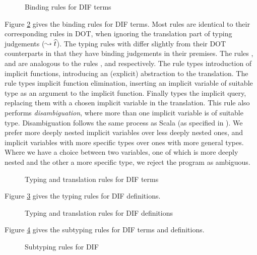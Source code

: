 \begin{figure}[h]
    
    \caption{Binding rules for DIF terms}
    \label{figure_binding_rules}
\end{figure}

Figure \ref{figure_typing_rules_terms} gives the binding rules for DIF terms.
Most rules are identical to their corresponding rules in DOT, when ignoring the
translation part of typing judgements ($\leadsto \widehat{t}$). The typing rules
with differ slightly from their DOT counterparts in that they have binding
judgements in their premises. The rules ,  and
 are analogous to the rules ,  and
 respectively. The rule  types introduction of
implicit functions, introducing an (explicit) abstraction to the translation.
The rule  types implicit function elimination, inserting an
implicit variable of suitable type as an argument to the implicit function.
Finally  types the implicit query, replacing them with a chosen
implicit variable in the translation. This rule also performs
\emph{disambiguation}, where more than one implicit variable is of suitable
type. Disambiguation follows the same process as Scala (as specified in
\cite{OBLB18}). We prefer more deeply nested implicit variables over less deeply
nested ones, and implicit variables with more specific types over ones with more
general types. Where we have a choice between two variables, one of which is
more deeply nested and the other a more specific type, we reject the program as
ambiguous.

\begin{figure}[h]
    
    \caption{Typing and translation rules for DIF terms}
    \label{figure_typing_rules_terms}
\end{figure}

Figure \ref{figure_typing_rules_definitions} gives the typing rules for DIF
definitions.

\begin{figure}[h]
    
    \caption{Typing and translation rules for DIF definitions}
    \label{figure_typing_rules_definitions}
\end{figure}

Figure \ref{figure_subtyping_rules} gives the subtyping rules for DIF terms and
definitions.

\begin{figure}[h]
    
    \caption{Subtyping rules for DIF}
    \label{figure_subtyping_rules}
\end{figure}

